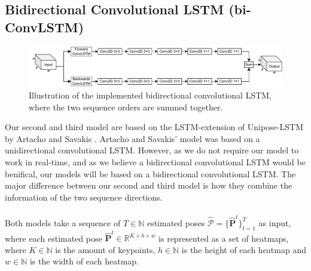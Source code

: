 \documentclass[./main.tex]{subfiles}
\begin{document}
\subsection{Bidirectional Convolutional LSTM (bi-ConvLSTM)}
\label{sec:bi-ConvLSTMs}
\begin{figure}[htbp]
    \centering
    \includegraphics[width=\textwidth]{./entities/bi_conv_lstm.pdf}
    \caption{Illustration of the implemented bidirectional convolutional LSTM, where the two sequence orders are summed together.}
    \label{fig:bi_conv_lstm}
\end{figure}

\noindent Our second and third model are based on the LSTM-extension of Unipose-LSTM by Artacho and Savakis \cite{https://doi.org/10.48550/arxiv.2001.08095}. Artacho and Savakis' model was based on a unidirectional convolutional LSTM. However, as we do not require our model to work in real-time, and as we believe a bidirectional convolutional LSTM would be benifical, our models will be based on a bidirectional convolutional LSTM. The major difference between our second and third model is how they combine the information of the two sequence directions.
\\
\\
Both models take a sequence of $T \in \mathbb{N}$ estimated poses $\hat{\mathcal{P}} = \{\hat{\bm{P}}^t\}_{t = 1} ^T$ as input, where each estimated pose $\hat{\bm{P}}^t \in \mathbb{R}^{K \times h \times w}$ is represented as a set of heatmaps, where $K \in \mathbb{N}$ is the amount of keypoints, $h \in \mathbb{N}$ is the height of each heatmap and $w \in \mathbb{N}$ is the width of each heatmap. 
\end{document}
